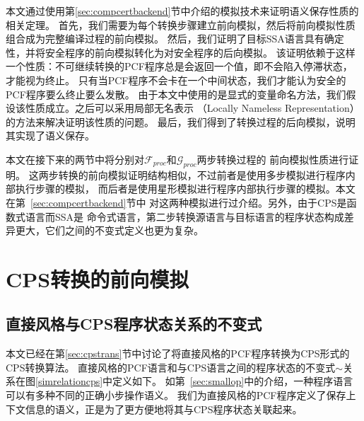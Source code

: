 本文通过使用第\ref{sec:compcertbackend}节中介绍的模拟技术来证明语义保存性质的相关定理。
首先，我们需要为每个转换步骤建立前向模拟，然后将前向模拟性质组合成为完整编译过程的前向模拟。
然后，我们证明了目标SSA语言具有确定性，并将安全程序的前向模拟转化为对安全程序的后向模拟。
该证明依赖于这样一个性质：不可继续转换的PCF程序总是会返回一个值，即不会陷入停滞状态，才能视为终止。
只有当PCF程序不会卡在一个中间状态，我们才能认为安全的PCF程序要么终止要么发散。
由于本文中使用的是显式的变量命名方法，我们假设该性质成立。之后可以采用局部无名表示
（Locally Nameless Representation）的方法来解决证明该性质的问题。
最后，我们得到了转换过程的后向模拟，说明其实现了语义保存。

本文在接下来的两节中将分别对$\mathcal{F}_{proc}$和$\mathcal{G}_{proc}$两步转换过程的
前向模拟性质进行证明。
这两步转换的前向模拟证明结构相似，不过前者是使用多步模拟进行程序内部执行步骤的模拟，
而后者是使用星形模拟进行程序内部执行步骤的模拟。本文在第~\ref{sec:compcertbackend}节中
对这两种模拟进行过介绍。另外，由于CPS是函数式语言而SSA是
命令式语言，第二步转换源语言与目标语言的程序状态构成差异更大，它们之间的不变式定义也更为复杂。

\section{CPS转换的前向模拟} \label{sec:cpsforward}

\subsection{直接风格与CPS程序状态关系的不变式}

本文已经在第\ref{sec:cpstrans}节中讨论了将直接风格的PCF程序转换为CPS形式的CPS转换算法。
直接风格的PCF语言和与CPS语言之间的程序状态的不变式$\sim$关系在图\ref{simrelationcps}中定义如下。
如第~\ref{sec:smallop}中的介绍，一种程序语言可以有多种不同的正确小步操作语义。
我们为直接风格的PCF程序定义了保存上下文信息的语义，正是为了更方便地将其与CPS程序状态关联起来。

